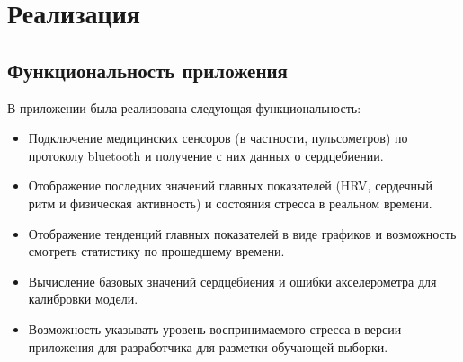 \documentclass[14pt]{matmex-diploma-custom}
\begin{document}
\section{Реализация}
\subsection{Функциональность приложения}
В приложении была реализована следующая функциональность:
\begin{itemize}
\item Подключение медицинских сенсоров (в частности, пульсометров) по протоколу
  bluetooth и получение с них данных о сердцебиении.
\item Отображение последних значений главных показателей (HRV, сердечный ритм и
  физическая активность) и состояния стресса в реальном времени.
\item Отображение тенденций главных показателей в виде графиков и возможность
  смотреть статистику по прошедшему времени.
\item Вычисление базовых значений сердцебиения и ошибки акселерометра для калибровки модели.
\item Возможность указывать уровень воспринимаемого стресса в версии приложения
  для разработчика для разметки обучающей выборки.
\end{itemize}
\end{document}
